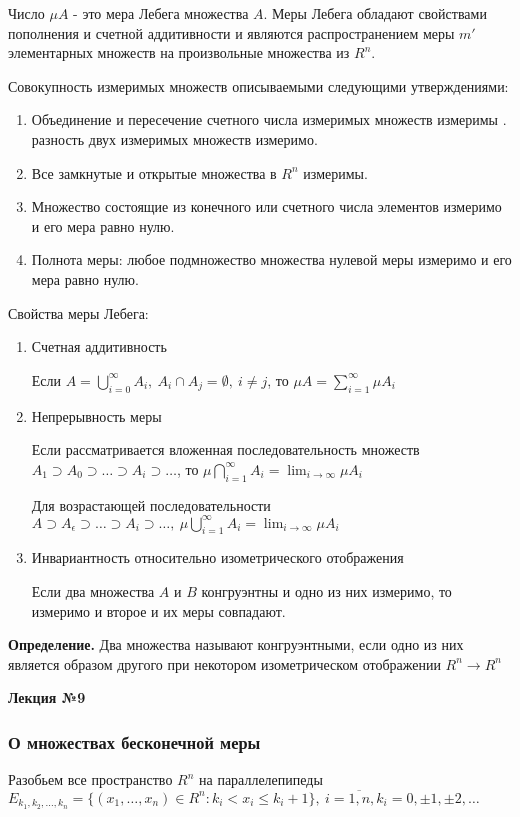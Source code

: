 \documentclass[14pt,a4paper]{extarticle}
\theoremstyle{definition}
\theoremstyle{remark}
\newcommand{\be}{\begin{enumerate}}
\newcommand{\ee}{\end{enumerate}}
\newcommand{\sep}{ , \ \allowbreak }
\renewcommand{\[}{\begin{dmath*}[compact]}
\renewcommand{\]}{\end{dmath*}}
\newcommand{\tdef}{\textbf{Определение.} }
\begin{document}
Число $\mu A$ - это мера Лебега множества $A$. Меры Лебега обладают свойствами пополнения и счетной аддитивности и являются распространением меры $m'$ элементарных множеств на произвольные множества из $R^n$.

Совокупность измеримых множеств описываемыми следующими утверждениями:
\be
  \item Объединение и пересечение счетного числа измеримых множеств измеримы . разность двух измеримых множеств измеримо.
  \item Все замкнутые и открытые множества в $R^n$ измеримы.
  \item Множество состоящие из конечного или счетного числа элементов измеримо и его мера равно нулю.
  \item Полнота меры: любое подмножество множества нулевой меры измеримо и его мера равно нулю.
\ee

Свойства меры Лебега:
\be
  \item Счетная аддитивность

  Если $A=\bigcup _{i=0}^\infty A_i\sep A_i\cap A_j=\emptyset\sep i\neq j$, то $\mu A=\sum_{i=1}^\infty \mu A_i$

  \item Непрерывность меры

  Если рассматривается вложенная последовательность множеств $A_1 \supset A_0 \supset \dots \supset A_i \supset \dots$, то $\mu\bigcap _{i=1}^\infty A_i=\lim_{i \to \infty} \mu A_i $

  Для возрастающей последовательности $A \supset A _ \epsilon \supset \dots \supset A_i \supset \dots \sep \mu \bigcup _ {i = 1}  ^ \infty A_i = \lim_{i \to \infty} \mu A_i$

  \item Инвариантность относительно изометрического отображения

  Если два множества $A$ и $B$ конгруэнтны и одно из них измеримо, то измеримо и второе и их меры совпадают.
\ee

\tdef Два множества называют конгруэнтными, если одно из них является образом другого при некотором изометрическом отображении $R^n \to R^n$

\textbf{Лекция №9}

\subsubsection{О множествах бесконечной меры}

Разобьем все пространство $R^n$ на параллелепипеды $E_{k_1,k_2,\dots,k_n}=\{(x_1,\dots,x_n) \in R^n:k_i<x_i \leq k_i+1 \} \sep i=\overline{1,n}, k_i=0, \pm 1, \pm 2, \dots$
\end{document}
